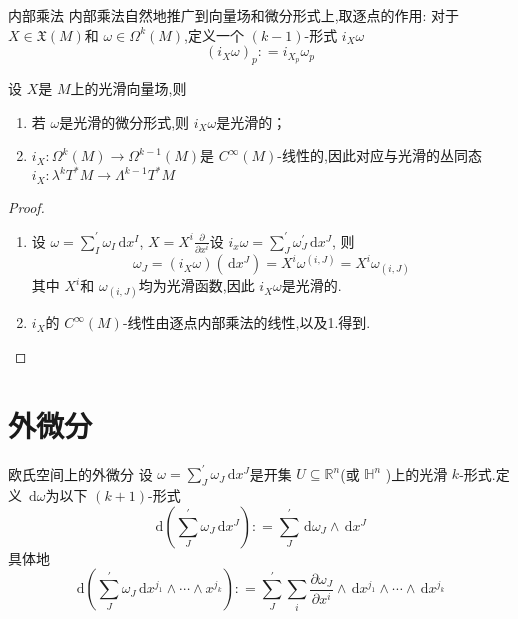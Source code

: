\documentclass[../../几何与拓扑.tex]{subfiles}
\begin{document}
\begin{definition}{内部乘法}
    内部乘法自然地推广到向量场和微分形式上,取逐点的作用: 对于 $ X \in \mathfrak{X}\left( M \right)  $和 $ \omega  \in \Omega ^{k}\left( M \right)  $,定义一个 $ \left( k-1 \right)  $-形式 $ i_{X}\omega  $ $$
    \left( i_{X}\omega  \right)_{p} : = i_{X_{p}} \omega _{p}
    $$    
\end{definition}

\begin{proposition}
    设 $ X $是 $ M $上的光滑向量场,则 
    \begin{enumerate}
        \item 若 $ \omega  $是光滑的微分形式,则 $ i_{X}\omega  $是光滑的；
        \item $ i_{X}: \Omega ^{k}\left( M \right)\to  \Omega ^{k-1}\left( M \right)   $是 $ C^{\infty}\left( M \right)  $-线性的,因此对应与光滑的丛同态 $ i_{X}: \lambda ^{k}T^{*}M\to  \Lambda ^{k-1}T^{*} M $      
    \end{enumerate}

      
\end{proposition}
\begin{proof}
    \begin{enumerate}
        \item 设 $ \omega = \sum _{I}^{\prime} \omega _{I}\,\mathrm{d} x^{I} $, $ X = X^{i} \frac{\partial }{\partial x^{i}} $设 $ i_{x}\omega = \sum _{J}^{\prime} \omega ^{\prime} _{J}\,\mathrm{d} x^{J} $, 则 $$
        \omega _{J}   = \left( i_{X}\omega  \right) \left( \,\mathrm{d} x^{J} \right)= X^{i}\omega ^{\left( i,J \right) }  = X^{i}\omega _{\left( i,J \right) }
        $$ 其中 $ X^{i} $和 $ \omega _{\left( i,J \right) } $均为光滑函数,因此 $ i_{X}\omega  $是光滑的.
        \item $ i_{X} $的 $ C^{\infty}\left( M \right)  $-线性由逐点内部乘法的线性,以及1.得到.  
    \end{enumerate}
    
\end{proof}
\section{外微分}



\begin{definition}{欧氏空间上的外微分}
    设 $  \omega = \sum _{J}^{\prime}  \omega _{J   }\,\mathrm{d} x^{J} $是开集 $ U\subseteq \mathbb{R} ^{n} $(或 $ \mathbb{H}^{n} $ )上的光滑 $ k $-形式.定义 $ \,\mathrm{d}  \omega  $为以下 $ \left( k+ 1 \right)  $-形式 $$
    \,\mathrm{d} \left( \sum _{J}^{\prime}  \omega _{J}\,\mathrm{d} x^{J} \right): = \sum _{J}^{\prime} \,\mathrm{d}  \omega _{J}\wedge \,\mathrm{d} x^{J}
    $$     具体地 $$
    \,\mathrm{d} \left( \sum _{J}^{\prime}  \omega _{J} \,\mathrm{d} x^{j_1}\wedge \cdots \wedge x^{j_{k}} \right) : = \sum _{J}^{\prime} \sum _{i} \frac{\partial  \omega _{J}}{\partial x^{i}}\wedge \,\mathrm{d} x^{j_1}\wedge \cdots \wedge \,\mathrm{d} x^{j_{k}}
    $$
\end{definition}
\end{document}
